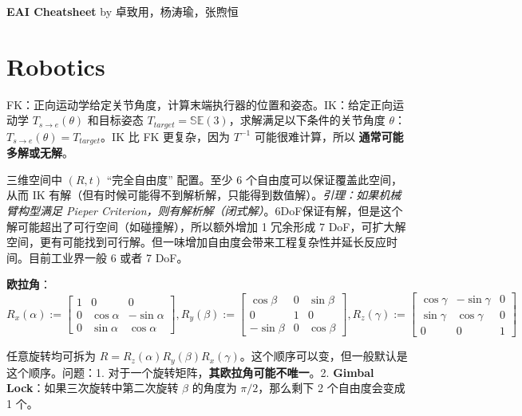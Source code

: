 \documentclass[
  8pt]{extarticle}
\author{}
\date{}
\begin{document}
\begin{multicols*}{4}
    \footnotesize

    \begin{center}
        \textbf{EAI Cheatsheet} by 卓致用，杨涛瑜，张煦恒
    \end{center}
    \vspace{-1.75em} %

\hypertarget{robotics}{%
\section{Robotics}\label{robotics}}

FK：正向运动学给定关节角度，计算末端执行器的位置和姿态。IK：给定正向运动学
\(T_{s \rightarrow e}(\theta)\) 和目标姿态
\(T_{target} = \mathbb{SE}(3)\)，求解满足以下条件的关节角度 \(\theta\)：
\(T_{s \rightarrow e}(\theta) = T_{target}\)。IK 比 FK 更复杂，因为
\(T^{-1}\) 可能很难计算，所以 \textbf{通常可能多解或无解}。

三维空间中 \((R,t)\) ``完全自由度'' 配置。至少 6
个自由度可以保证覆盖此空间，从而 IK
有解（但有时候可能得不到解析解，只能得到数值解）。\emph{引理：如果机械臂构型满足
Pieper
Criterion，则有解析解（闭式解）}。6DoF保证有解，但是这个解可能超出了可行空间（如碰撞解），所以额外增加
1 冗余形成 7
DoF，可扩大解空间，更有可能找到可行解。但一味增加自由度会带来工程复杂性并延长反应时间。目前工业界一般
6 或者 7 DoF。

\textbf{欧拉角}：\(R_{x}(\alpha):=\begin{bmatrix}1&0&0\\0&\cos\alpha&-\sin\alpha\\0&\sin\alpha&\cos\alpha\end{bmatrix}, R_{y}(\beta):=\begin{bmatrix}\cos\beta&0&\sin\beta\\0&1&0\\-\sin\beta&0&\cos\beta\end{bmatrix}, R_{z}(\gamma):=\begin{bmatrix}\cos\gamma&-\sin\gamma&0\\\sin\gamma&\cos\gamma&0\\0&0&1\end{bmatrix}\)

任意旋转均可拆为
\(R=R_{z}(\alpha)R_{y}(\beta)R_{x}(\gamma)\)。这个顺序可以变，但一般默认是这个顺序。问题：1.
对于一个旋转矩阵，\textbf{其欧拉角可能不唯一}。2. \textbf{Gimbal
Lock}：如果三次旋转中第二次旋转 \(\beta\) 的角度为 \(\pi/2\)，那么剩下 2
个自由度会变成 1 个。


\end{multicols*}
\end{document}
